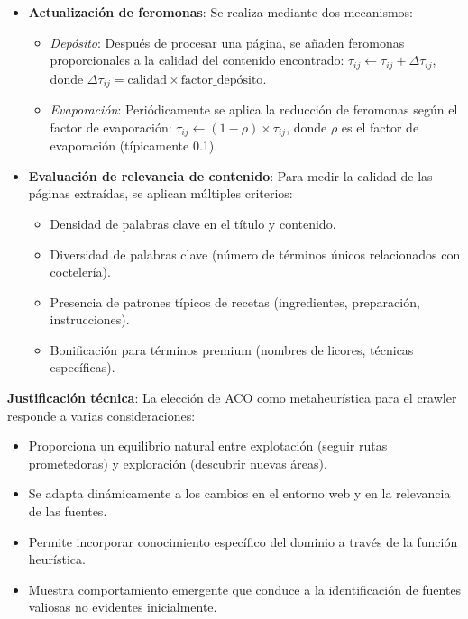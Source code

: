 \documentclass[runningheads]{llncs}
\begin{document}
\begin{itemize}
    \item \textbf{Actualización de feromonas}: Se realiza mediante dos mecanismos:
    \begin{itemize}
        \item \textit{Depósito}: Después de procesar una página, se añaden feromonas proporcionales a la calidad del contenido encontrado: $\tau_{ij} \leftarrow \tau_{ij} + \Delta\tau_{ij}$, donde $\Delta\tau_{ij} = \text{calidad} \times \text{factor\_dep\'osito}$.
        \item \textit{Evaporación}: Periódicamente se aplica la reducción de feromonas según el factor de evaporación: $\tau_{ij} \leftarrow (1-\rho) \times \tau_{ij}$, donde $\rho$ es el factor de evaporación (típicamente 0.1).
    \end{itemize}
    
    \item \textbf{Evaluación de relevancia de contenido}: Para medir la calidad de las páginas extraídas, se aplican múltiples criterios:
    \begin{itemize}
        \item Densidad de palabras clave en el título y contenido.
        \item Diversidad de palabras clave (número de términos únicos relacionados con coctelería).
        \item Presencia de patrones típicos de recetas (ingredientes, preparación, instrucciones).
        \item Bonificación para términos premium (nombres de licores, técnicas específicas).
    \end{itemize}
\end{itemize}

\textbf{Justificación técnica}: La elección de ACO como metaheurística para el crawler responde a varias consideraciones:

\begin{itemize}
    \item Proporciona un equilibrio natural entre explotación (seguir rutas prometedoras) y exploración (descubrir nuevas áreas).
    \item Se adapta dinámicamente a los cambios en el entorno web y en la relevancia de las fuentes.
    \item Permite incorporar conocimiento específico del dominio a través de la función heurística.
    \item Muestra comportamiento emergente que conduce a la identificación de fuentes valiosas no evidentes inicialmente.
\end{itemize}
\end{document}
